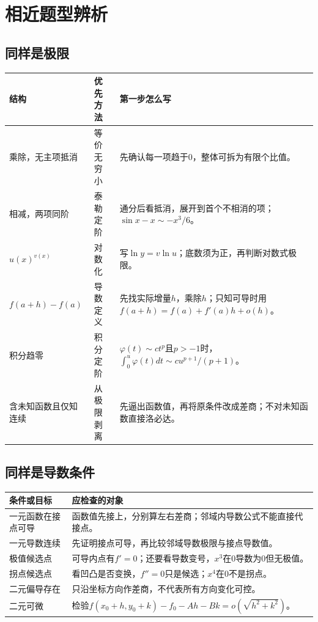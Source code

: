 \chapter{相近题型辨析}
\section{同样是极限}
\begin{tabularx}{\textwidth}{p{29mm}Y Y}
\toprule 结构&优先方法&第一步怎么写\\\midrule
乘除，无主项抵消&等价无穷小&先确认每一项趋于0，整体可拆为有限个比值。\\
相减，两项同阶&泰勒定阶&通分后看抵消，展开到首个不相消的项；$\sin x-x\sim-x^3/6$。\\
$u(x)^{v(x)}$&对数化&写$\ln y=v\ln u$；底数须为正，再判断对数式极限。\\
$f(a+h)-f(a)$&导数定义&先找实际增量$h$，乘除$h$；只知可导时用$f(a+h)=f(a)+f'(a)h+o(h)$。\\
积分趋零&积分定阶&$\varphi(t)\sim ct^p$且$p>-1$时，$\int_0^u\varphi(t)dt\sim cu^{p+1}/(p+1)$。\\
含未知函数且仅知连续&从极限剥离&先逼出函数值，再将原条件改成差商；不对未知函数直接洛必达。\\\bottomrule
\end{tabularx}

\section{同样是导数条件}
\begin{tabularx}{\textwidth}{p{33mm}Y}
\toprule 条件或目标&应检查的对象\\\midrule
一元函数在接点可导&函数值先接上，分别算左右差商；邻域内导数公式不能直接代接点。\\
一元导数连续&先证明接点可导，再比较邻域导数极限与接点导数值。\\
极值候选点&可导内点有$f'=0$；还要看导数变号，$x^3$在0导数为0但无极值。\\
拐点候选点&看凹凸是否变换，$f''=0$只是候选；$x^4$在0不是拐点。\\
二元偏导存在&只沿坐标方向作差商，不代表所有方向变化可控。\\
二元可微&检验$f(x_0+h,y_0+k)-f_0-Ah-Bk=o(\sqrt{h^2+k^2})$。\\\bottomrule
\end{tabularx}

